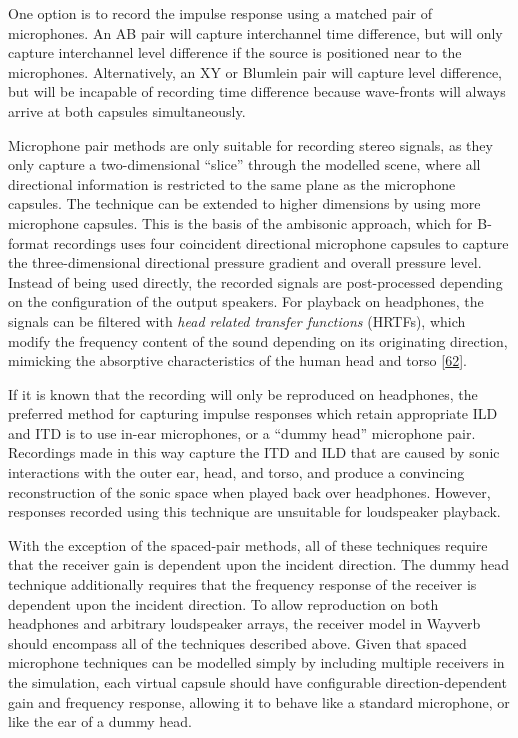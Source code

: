 \documentclass[]{scrreprt}
\begin{document}
One option is to record the impulse response using a matched pair of
microphones. An AB pair will capture interchannel time difference, but
will only capture interchannel level difference if the source is
positioned near to the microphones. Alternatively, an XY or Blumlein
pair will capture level difference, but will be incapable of recording
time difference because wave-fronts will always arrive at both capsules
simultaneously.

Microphone pair methods are only suitable for recording stereo signals,
as they only capture a two-dimensional ``slice'' through the modelled
scene, where all directional information is restricted to the same plane
as the microphone capsules. The technique can be extended to higher
dimensions by using more microphone capsules. This is the basis of the
ambisonic approach, which for B-format recordings uses four coincident
directional microphone capsules to capture the three-dimensional
directional pressure gradient and overall pressure level. Instead of
being used directly, the recorded signals are post-processed depending
on the configuration of the output speakers. For playback on headphones,
the signals can be filtered with \emph{head related transfer functions}
(HRTFs), which modify the frequency content of the sound depending on
its originating direction, mimicking the absorptive characteristics of
the human head and torso
{[}\protect\hyperlink{ref-noisternigux5f3dux5f2003}{62}{]}.

If it is known that the recording will only be reproduced on headphones,
the preferred method for capturing impulse responses which retain
appropriate ILD and ITD is to use in-ear microphones, or a ``dummy
head'' microphone pair. Recordings made in this way capture the ITD and
ILD that are caused by sonic interactions with the outer ear, head, and
torso, and produce a convincing reconstruction of the sonic space when
played back over headphones. However, responses recorded using this
technique are unsuitable for loudspeaker playback.

With the exception of the spaced-pair methods, all of these techniques
require that the receiver gain is dependent upon the incident direction.
The dummy head technique additionally requires that the frequency
response of the receiver is dependent upon the incident direction. To
allow reproduction on both headphones and arbitrary loudspeaker arrays,
the receiver model in Wayverb should encompass all of the techniques
described above. Given that spaced microphone techniques can be modelled
simply by including multiple receivers in the simulation, each virtual
capsule should have configurable direction-dependent gain and frequency
response, allowing it to behave like a standard microphone, or like the
ear of a dummy head.
\end{document}
